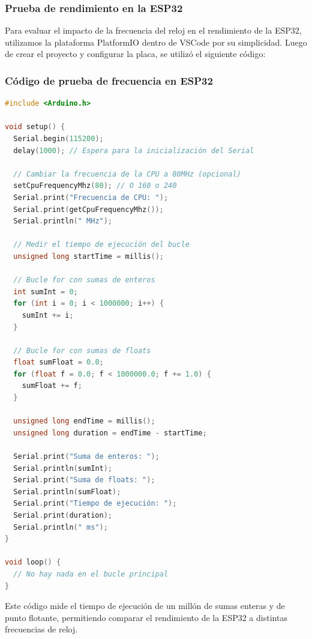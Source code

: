\bigskip

\subsubsection*{Prueba de rendimiento en la ESP32}

Para evaluar el impacto de la frecuencia del reloj en el rendimiento de la ESP32, utilizamos la plataforma PlatformIO dentro de VSCode por su simplicidad. Luego de crear el proyecto y configurar la placa, se utilizó el siguiente código:

\lstset{style=arduino}

\subsubsection*{Código de prueba de frecuencia en ESP32}

\begin{lstlisting}[language=C++, caption={Código para medir el tiempo de ejecución en ESP32}, label=lst:esp32_code]
#include <Arduino.h>

void setup() {
  Serial.begin(115200);
  delay(1000); // Espera para la inicialización del Serial

  // Cambiar la frecuencia de la CPU a 80MHz (opcional)
  setCpuFrequencyMhz(80); // O 160 o 240
  Serial.print("Frecuencia de CPU: ");
  Serial.print(getCpuFrequencyMhz());
  Serial.println(" MHz");

  // Medir el tiempo de ejecución del bucle
  unsigned long startTime = millis();

  // Bucle for con sumas de enteros
  int sumInt = 0;
  for (int i = 0; i < 1000000; i++) {
    sumInt += i;
  }

  // Bucle for con sumas de floats
  float sumFloat = 0.0;
  for (float f = 0.0; f < 1000000.0; f += 1.0) {
    sumFloat += f;
  }

  unsigned long endTime = millis();
  unsigned long duration = endTime - startTime;

  Serial.print("Suma de enteros: ");
  Serial.println(sumInt);
  Serial.print("Suma de floats: ");
  Serial.println(sumFloat);
  Serial.print("Tiempo de ejecución: ");
  Serial.print(duration);
  Serial.println(" ms");
}

void loop() {
  // No hay nada en el bucle principal
}
\end{lstlisting}

Este código mide el tiempo de ejecución de un millón de sumas enteras y de punto flotante, permitiendo comparar el rendimiento de la ESP32 a distintas frecuencias de reloj.

